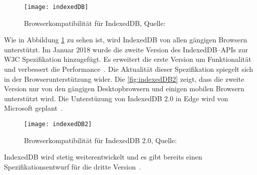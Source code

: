 \begin{figure}[H]
	\centering
	\texttt{[image: indexedDB]}
	\grayRule
	\caption[Browserkompatibilität für IndexedDB]{Browserkompatibilität für IndexedDB, Quelle: ~\cite{caniuse-idb}}
	\label{fig:indexedDB}
\end{figure}
Wie in Abbildung \ref{fig:indexedDB} zu sehen ist, wird IndexedDB von allen gängigen Browsern unterstützt. 
%
Im Januar 2018 wurde die zweite Version des IndexedDB--\glspl{API} zur W3C Spezifikation hinzugefügt. Es erweitert die erste Version um Funktionalität und verbessert die Performance~\cite{idb2}.
Die Aktualität dieser Spezifikation spiegelt sich in der Browserunterstützung wider. Die \autoref{fig:indexedDB2} zeigt, dass die zweite Version nur von den gängigen Desktopbrowsern und einigen mobilen Browsern unterstützt wird. Die Unterstüzung von IndexedDB 2.0 in Edge wird von Microsoft geplant~\cite{edge}.
\begin{figure}[H]
	\centering
	\texttt{[image: indexedDB2]}
	\grayRule
	\caption[Browserkompatibilität für IndexedDB 2.0]{Browserkompatibilität für IndexedDB 2.0, Quelle: ~\cite{caniuse-idb}}
	\label{fig:indexedDB2}
\end{figure}
IndexedDB wird stetig weiterentwickelt und es gibt bereits einen Spezifikationsentwurf für die dritte Version~\cite{idb3}. 